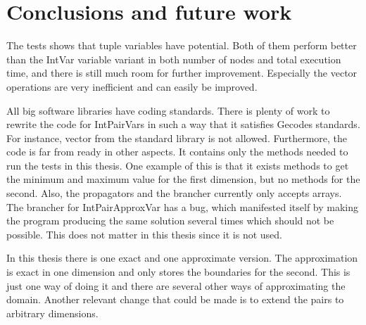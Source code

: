 \documentclass[a4paper,11pt]{article}
\begin{document}
\section{Conclusions and future work}
The tests shows that tuple variables have potential. Both of them perform better than the IntVar variable variant in both number of nodes and total execution time, and there is still much room for further improvement. Especially the vector operations are very inefficient and can easily be improved.

All big software libraries have coding standards. There is plenty of work to rewrite the code for IntPairVars in such a way that it satisfies Gecodes standards. For instance, vector from the standard library is not allowed. Furthermore, the code is far from ready in other aspects. It contains only the methods needed to run the tests in this thesis. One example of this is that it exists methods to get the minimum and maximum value for the first dimension, but no methods for the second. Also, the propagators and the brancher currently only accepts arrays. The brancher for IntPairApproxVar has a bug, which manifested itself by making the program producing the same solution several times which should not be possible. This does not matter in this thesis since it is not used.

In this thesis there is one exact and one approximate version. The approximation is exact in one dimension and only stores the boundaries for the second. This is just one way of doing it and there are several other ways of approximating the domain. Another relevant change that could be made is to extend the pairs to arbitrary dimensions.







%
%
%
%
\end{document}
